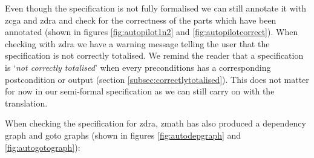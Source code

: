 Even though the specification is not fully formalised we can still annotate it
with \gls{zcga} and \gls{zdra} and check for the correctness of the parts which
have been annotated (shown in figures \ref{fig:autopilot1n2} and
\ref{fig:autopilotcorrect}). When checking with \gls{zdra} we have a warning
message telling the user that the specification is not correctly totalised.
We remind the reader that a specification is `\textit{not correctly totalised}' when 
every preconditions has a corresponding postcondition or output (section \ref{subsec:correctlytotalised}). 
This does not matter for now in our semi-formal specification
as we can still carry on with the translation.

When checking the specification for \gls{zdra}, \gls{zmath} has also produced a
dependency graph and goto graphs (shown in figures \ref{fig:autodepgraph} and
\ref{fig:autogotograph}):

